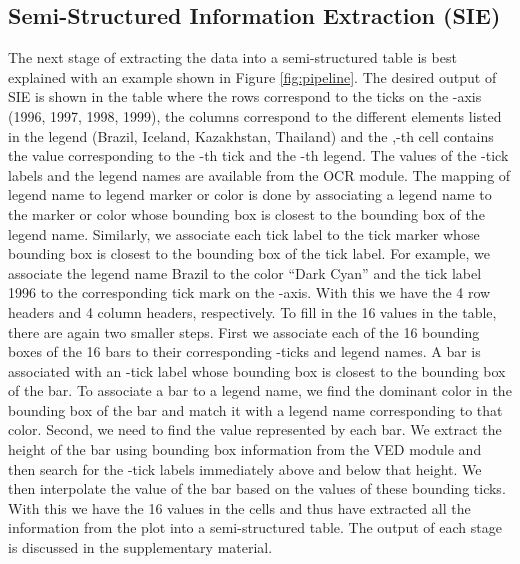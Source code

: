 \documentclass[10pt,twocolumn,letterpaper]{article}
\begin{document}
\subsection{Semi-Structured Information Extraction (SIE)}
The next stage of extracting the data into a semi-structured table is best explained with an example shown in Figure \ref{fig:pipeline}.
The desired output of SIE is shown in the table where the rows correspond to the ticks on the -axis (1996, 1997, 1998, 1999), the columns correspond to the different elements listed in the legend (Brazil, Iceland, Kazakhstan, Thailand) and the ,-th cell contains the value corresponding to the -th tick and the -th legend. 
The values of the -tick labels and the legend names are available from the OCR module. 
The mapping of legend name to legend marker or color is done by associating a legend name to the marker or color whose bounding box is closest to the bounding box of the legend name.
Similarly, we associate each tick label to the tick marker whose bounding box is closest to the bounding box of the tick label. 
For example, we associate the legend name Brazil to the color ``Dark Cyan'' and the tick label 1996 to the corresponding tick mark on the -axis. 
With this we have the 4 row headers and 4 column headers, respectively.
To fill in the 16 values in the table, there are again two smaller steps. 
First we associate each of the 16 bounding boxes of the 16 bars to their corresponding -ticks and legend names. 
A bar is associated with an -tick label whose bounding box is closest to the bounding box of the bar. 
To associate a bar to a legend name, we find the dominant color in the bounding box of the bar and match it with a legend name corresponding to that color.
Second, we need to find the value represented by each bar. 
We extract the height of the bar using bounding box information from the VED module and then search for the -tick labels immediately above and below that height. 
We then interpolate the value of the bar based on the values of these bounding ticks.
With this we have the 16 values in the cells and thus have extracted all the information from the plot into a semi-structured table. The output of each stage  is discussed in the supplementary material.
\end{document}

